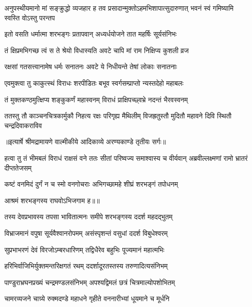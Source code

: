 \threelineshloka
{अनुपस्थीयमानो मां सङ्क्रुद्धो व्यजहार ह}
{तव प्रसादान्मुक्तोऽहमभिशापात्सुदारुणात्}
{भवनं स्वं गमिष्यामि स्वस्ति वोऽस्तु परन्तप} %

\twolineshloka
{इतो वसति धर्मात्मा शरभङ्गः प्रतापवान्}
{अध्यर्धयोजने तात महर्षिः सूर्यसंनिभः} %

\twolineshloka
{तं क्षिप्रमभिगच्छ त्वं स ते श्रेयो विधास्यति}
{अवटे चापि मां राम निक्षिप्य कुशली व्रज} %

\twolineshloka
{रक्षसां गतसत्त्वानामेष धर्मः सनातनः}
{अवटे ये निधीयन्ते तेषां लोकाः सनातनाः} %

\twolineshloka
{एवमुक्त्वा तु काकुत्स्थं विराधः शरपीडितः}
{बभूव स्वर्गसम्प्राप्तो न्यस्तदेहो महाबलः} %

\twolineshloka
{तं मुक्तकण्ठमुत्क्षिप्य शङ्कुकर्णं महास्वनम्}
{विराधं प्राक्षिपच्छ्वभ्रे नदन्तं भैरवस्वनम्} %

\fourlineindentedshloka
{ततस्तु तौ काञ्चनचित्रकार्मुकौ}
{निहत्य रक्षः परिगृह्य मैथिलीम्}
{विजह्रतुस्तौ मुदितौ महावने}
{दिवि स्थितौ चन्द्रदिवाकराविव} %


{॥इत्यार्षे श्रीमद्रामायणे वाल्मीकीये आदिकाव्ये अरण्यकाण्डे तृतीयः सर्गः॥}


\threelineshloka
{हत्वा तु तं भीमबलं विराधं राक्षसं वने}
{ततः सीतां परिष्वज्य समाश्वास्य च वीर्यवान्}
{अब्रवील्लक्ष्मणां रामो भ्रातरं दीप्ततेजसम्} %

\twolineshloka
{कष्टं वनमिदं दुर्गं न च स्मो वनगोचराः}
{अभिगच्छामहे शीघ्रं शरभङ्गं तपोधनम्} %

{आश्रमं शरभङ्गस्य राघवोऽभिजगाम ह॥॥} %

\addtocounter{shlokacount}{1}

\twolineshloka
{तस्य देवप्रभावस्य तपसा भावितात्मनः}
{समीपे शरभङ्गस्य ददर्श महदद्भुतम्} %

\twolineshloka
{विभ्राजमानं वपुषा सूर्यवैश्वानरोपमम्}
{असंस्पृशन्तं वसुधां ददर्श विबुधेश्वरम्} %

\twolineshloka
{सुप्रभाभरणं देवं विरजोऽम्बरधारिणम्}
{तद्विधैरेव बहुभिः पूज्यमानं महात्मभिः} %

\twolineshloka
{हरिभिर्वाजिभिर्युक्तमन्तरिक्षगतं रथम्}
{ददर्शादूरतस्तस्य तरुणादित्यसंनिभम्} %

\twolineshloka
{पाण्डुराभ्रघनप्रख्यं चन्द्रमण्डलसंनिभम्}
{अपश्यद्विमलं छत्रं चित्रमाल्योपशोभितम्} %

\twolineshloka
{चामरव्यजने चाग्र्ये रुक्मदण्डे महाधने}
{गृहीते वननारीभ्यां धूयमाने च मूर्धनि} %


